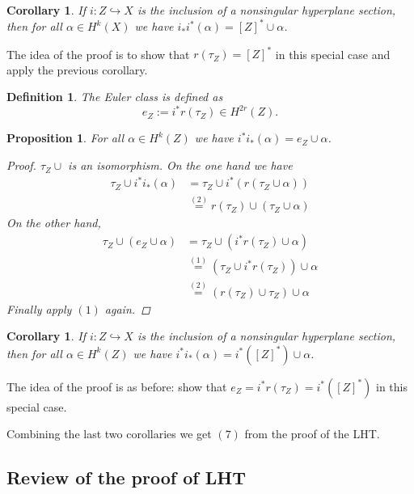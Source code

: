 \documentclass[A4paper, british, reqno]{amsart}
\theoremstyle{darkgreentheorem}
\newtheorem{prop}[thm]{Proposition}
\newtheorem{cor}[thm]{Corollary}
\theoremstyle{darkbluedefinition}
\newtheorem{defn}[thm]{Definition}
\theoremstyle{darkredexample}
\theoremstyle{remark}
\newcommand{\1}{\mathbbm{1}}
\begin{document}
\begin{cor}
    If $i\colon Z\hookrightarrow X$ is the inclusion of a nonsingular hyperplane section, then for all $\alpha \in H^{k}(X)$ we have $i_{*}i^{*}(\alpha)=[Z]^{*}\cup \alpha$.
\end{cor}

The idea of the proof is to show that $r(\tau_{Z})=[Z]^{*}$ in this special case and apply the previous corollary.

\begin{defn}
    The \textit{Euler class} is defined as
    \[ e_{Z}:= i^{*}r(\tau_{Z})\in H^{2r}(Z). \]
\end{defn}

\begin{prop}
    For all $\alpha\in H^{k}(Z)$ we have $i^{*}i_{*}(\alpha)=e_{Z}\cup \alpha$.
    \begin{proof}
	$\tau_{Z}\cup $ is an isomorphism.
	On the one hand we have
	\begin{align*}
	    \tau_{Z}\cup i^{*}i_{*}(\alpha) & = \tau_{Z}\cup i^{*}(r(\tau_{Z}\cup \alpha)) \\
	     & \overset{(2)}{=} r(\tau_{Z})\cup (\tau_{Z}\cup \alpha)
	\end{align*}
	On the other hand,
	\begin{align*}
	    \tau_{Z}\cup (e_{Z}\cup \alpha) & = \tau_{Z}\cup (i^{*}r(\tau_{Z})\cup \alpha) \\
	    & \overset{(1)}{=} (\tau_{Z}\cup i^{*}r(\tau_{Z}))\cup \alpha \\
	    & \overset{(2)}{=} (r(\tau_{Z})\cup \tau_{Z})\cup \alpha
	\end{align*}
	Finally apply $(1)$ again.
    \end{proof}
\end{prop}

\begin{cor}
    If $i\colon Z\hookrightarrow X$ is the inclusion of a nonsingular hyperplane section, then for all $\alpha \in H^{k}(Z)$ we have $i^{*}i_{*}(\alpha)=i^{*}([Z]^{*})\cup \alpha $.
\end{cor}

The idea of the proof is as before: show that $e_{Z}=i^{*}r(\tau_{Z})=i^{*}([Z]^{*})$ in this special case.

Combining the last two corollaries we get $(7)$ from the proof of the LHT.

\subsection{Review of the proof of LHT}
\end{document}
